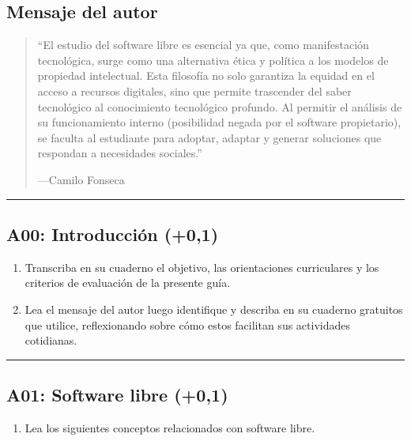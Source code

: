 \documentclass[letterpaper,10pt,spanish]{sphinxmanual}
\begin{document}
\subsection{Mensaje del autor}
\label{\detokenize{1_guias/10ofimatica/G1012:mensaje-del-autor}}\begin{quote}

\sphinxAtStartPar
“El estudio del software libre es esencial ya que, como manifestación tecnológica, surge como una alternativa ética y política a los modelos de propiedad intelectual. Esta filosofía no solo garantiza la equidad en el acceso a recursos digitales, sino que permite trascender del saber tecnológico al conocimiento tecnológico profundo. Al permitir el análisis de su funcionamiento interno (posibilidad negada por el software propietario), se faculta al estudiante para adoptar, adaptar y generar soluciones que respondan a necesidades sociales.”

\begin{flushright}
---Camilo Fonseca
\end{flushright}
\end{quote}


\bigskip\hrule\bigskip



\subsection{A00: Introducción (+0,1)}
\label{\detokenize{1_guias/10ofimatica/G1012:a00-introduccion-0-1}}
\sphinxAtStartPar
{}
\begin{enumerate}
%
\item {} 
\sphinxAtStartPar
Transcriba en su cuaderno el objetivo, las orientaciones curriculares y los criterios de evaluación de la presente guía.

\item {} 
\sphinxAtStartPar
Lea el mensaje del autor luego identifique y describa en su cuaderno  gratuitos que utilice, reflexionando sobre cómo estos facilitan sus actividades cotidianas.

\end{enumerate}


\bigskip\hrule\bigskip



\subsection{A01: Software libre (+0,1)}
\label{\detokenize{1_guias/10ofimatica/G1012:a01-software-libre-0-1}}
\sphinxAtStartPar
{}
\begin{enumerate}
%
\item {} 
\sphinxAtStartPar
Lea los siguientes conceptos relacionados con software libre.

\end{enumerate}
\end{document}
